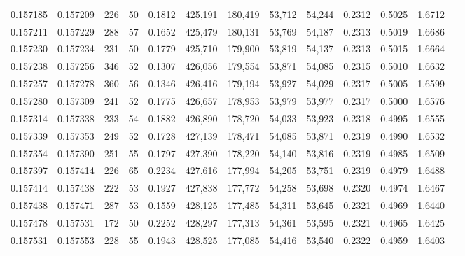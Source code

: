 \begin{tabular}{rrrrrrrrrrrrr}
0.157185 & 0.157209 &   226 &  50 &                                     0.1812 & 425,191 & 180,419 &  53,712 &  54,244 & 0.2312 & 0.5025 & 1.6712 \\
0.157211 & 0.157229 &   288 &  57 &                                     0.1652 & 425,479 & 180,131 &  53,769 &  54,187 & 0.2313 & 0.5019 & 1.6686 \\
0.157230 & 0.157234 &   231 &  50 &                                     0.1779 & 425,710 & 179,900 &  53,819 &  54,137 & 0.2313 & 0.5015 & 1.6664 \\
0.157238 & 0.157256 &   346 &  52 &                                     0.1307 & 426,056 & 179,554 &  53,871 &  54,085 & 0.2315 & 0.5010 & 1.6632 \\
0.157257 & 0.157278 &   360 &  56 &                                     0.1346 & 426,416 & 179,194 &  53,927 &  54,029 & 0.2317 & 0.5005 & 1.6599 \\
0.157280 & 0.157309 &   241 &  52 &                                     0.1775 & 426,657 & 178,953 &  53,979 &  53,977 & 0.2317 & 0.5000 & 1.6576 \\
0.157314 & 0.157338 &   233 &  54 &                                     0.1882 & 426,890 & 178,720 &  54,033 &  53,923 & 0.2318 & 0.4995 & 1.6555 \\
0.157339 & 0.157353 &   249 &  52 &                                     0.1728 & 427,139 & 178,471 &  54,085 &  53,871 & 0.2319 & 0.4990 & 1.6532 \\
0.157354 & 0.157390 &   251 &  55 &                                     0.1797 & 427,390 & 178,220 &  54,140 &  53,816 & 0.2319 & 0.4985 & 1.6509 \\
0.157397 & 0.157414 &   226 &  65 &                                     0.2234 & 427,616 & 177,994 &  54,205 &  53,751 & 0.2319 & 0.4979 & 1.6488 \\
0.157414 & 0.157438 &   222 &  53 &                                     0.1927 & 427,838 & 177,772 &  54,258 &  53,698 & 0.2320 & 0.4974 & 1.6467 \\
0.157438 & 0.157471 &   287 &  53 &                                     0.1559 & 428,125 & 177,485 &  54,311 &  53,645 & 0.2321 & 0.4969 & 1.6440 \\
0.157478 & 0.157531 &   172 &  50 &                                     0.2252 & 428,297 & 177,313 &  54,361 &  53,595 & 0.2321 & 0.4965 & 1.6425 \\
0.157531 & 0.157553 &   228 &  55 &                                     0.1943 & 428,525 & 177,085 &  54,416 &  53,540 & 0.2322 & 0.4959 & 1.6403 \\

\end{tabular}

